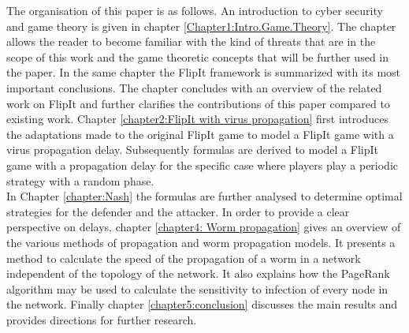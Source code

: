 The organisation of this paper is as follows. An introduction to cyber security and game theory is given in chapter \ref{Chapter1:Intro.Game.Theory}. The chapter allows the reader to become familiar with the kind of threats that are in the scope of this work and the game theoretic concepts that will be further used in the paper. In the same chapter the FlipIt framework is summarized with its most important conclusions. The chapter concludes with an overview of the related work on FlipIt and further clarifies the contributions of this paper compared to existing work. 
Chapter \ref{chapter2:FlipIt with virus propagation} first introduces the adaptations made to the original FlipIt game to model a FlipIt game with a virus propagation delay. Subsequently formulas are derived to model a FlipIt game with a propagation delay for the specific case where players play a periodic strategy with a random phase. \\
In Chapter \ref{chapter:Nash} the formulas are further analysed to determine optimal strategies for the defender and the attacker.
In order to provide a clear perspective on delays, chapter \ref{chapter4: Worm propagation} gives an overview of the various methods of propagation and worm propagation models. It presents a method to calculate the speed of the propagation of a worm in a network independent of the topology of the network. It also explains how the PageRank algorithm may be used to calculate the sensitivity to infection of every node in the network.
Finally chapter \ref{chapter5:conclusion} discusses the main results and provides directions for further research.


%
% 
%
%
%
% 
%
%
% 



